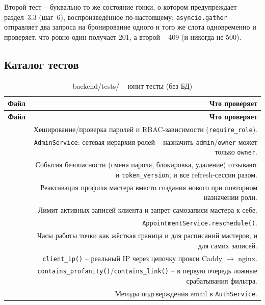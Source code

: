 Второй тест -- буквально то же состояние гонки, о котором предупреждает
раздел~3.3 (шаг~6), воспроизведённое по-настоящему: \texttt{asyncio.gather}
отправляет два запроса на бронирование одного и того же слота
одновременно и проверяет, что ровно один получает 201, а второй -- 409 (и
никогда не 500).

\subsection{Каталог тестов}

\begin{xltabular}{\textwidth}{M D}
\caption{backend/tests/ -- юнит-тесты (без БД)} \\
\hline
\textbf{Файл} & \textbf{Что проверяет} \\
\hline
\endfirsthead
\hline
\textbf{Файл} & \textbf{Что проверяет} \\
\hline
\endhead
\hline
\endfoot
{} & Хеширование/проверка паролей и
  RBAC-зависимости (\texttt{require_role}). \\
 & \texttt{AdminService}: сетевая
  иерархия ролей -- назначить \texttt{admin}/\texttt{owner} может только
  \texttt{owner}. \\
 & События безопасности
  (смена пароля, блокировка, удаление) отзывают и \texttt{token_version},
  и все refresh-сессии разом. \\
 & Реактивация профиля мастера
  вместо создания нового при повторном назначении роли. \\
 & Лимит активных записей
  клиента и запрет самозаписи мастера к себе. \\
 & \texttt{AppointmentService.reschedule()}. \\
 & Часы работы точки как жёсткая граница
  и для расписаний мастеров, и для самих записей. \\
 & \texttt{client_ip()} -- реальный IP через
  цепочку прокси Caddy $\to$ nginx. \\
 & \texttt{contains_profanity()}/\texttt{contains_link()}
  -- в первую очередь ложные срабатывания фильтра. \\
 & Методы подтверждения email в
  \texttt{AuthService}. \\

\end{xltabular}
